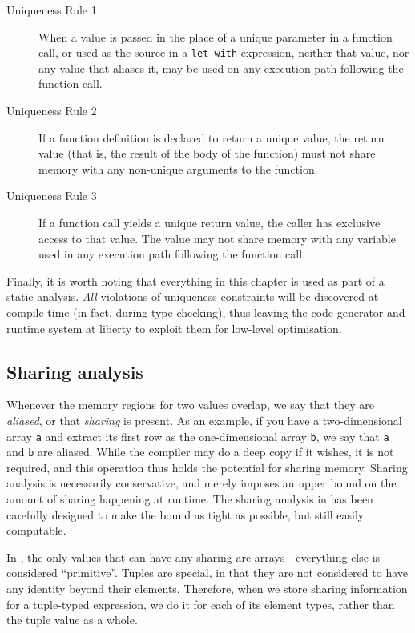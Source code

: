 \begin{description}
\item[Uniqueness Rule 1] When a value is passed in the place of a
  unique parameter in a function call, or used as the source in a
  \texttt{let-with} expression, neither that value, nor any value that
  aliases it, may be used on any execution path following the function
  call.

\item[Uniqueness Rule 2] If a function definition is declared to
  return a unique value, the return value (that is, the result of the
  body of the function) must not share memory with any non-unique
  arguments to the function.

\item[Uniqueness Rule 3] If a function call yields a unique
  return value, the caller has exclusive access to that value.  The
  value may not share memory with any variable used in any execution
  path following the function call.
\end{description}

Finally, it is worth noting that everything in this chapter is used as
part of a static analysis.  \textit{All} violations of uniqueness
constraints will be discovered at compile-time (in fact, during
type-checking), thus leaving the code generator and runtime system at
liberty to exploit them for low-level optimisation.

\subsection{Sharing analysis}
\label{sec:l0-sharing}

Whenever the memory regions for two values overlap, we say that they
are \textit{aliased}, or that \textit{sharing} is present.  As an
example, if you have a two-dimensional array \texttt{a} and extract
its first row as the one-dimensional array \texttt{b}, we say that
\texttt{a} and \texttt{b} are aliased.  While the \LO{} compiler may
do a deep copy if it wishes, it is not required, and this operation
thus holds the potential for sharing memory.  Sharing analysis is
necessarily conservative, and merely imposes an upper bound on the
amount of sharing happening at runtime.  The sharing analysis in \LO{}
has been carefully designed to make the bound as tight as possible,
but still easily computable.

In \LO{}, the only values that can have any sharing are arrays -
everything else is considered ``primitive''.  Tuples are special, in
that they are not considered to have any identity beyond their
elements.  Therefore, when we store sharing information for a
tuple-typed expression, we do it for each of its element types, rather
than the tuple value as a whole.

